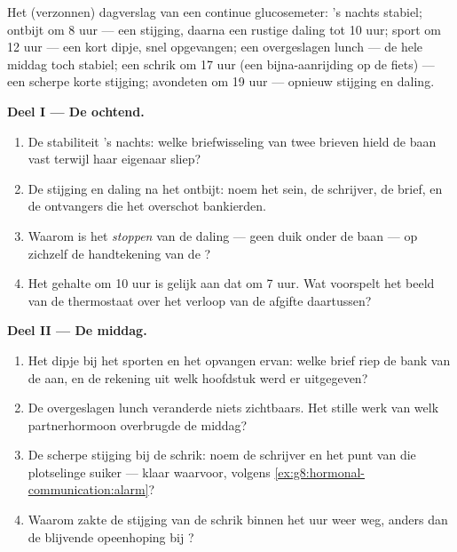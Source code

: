 \begin{problem}\label{pb:g8:hormonal-communication:1}
Het (verzonnen) dagverslag van een continue glucosemeter: 's nachts
stabiel; ontbijt om 8 uur --- een stijging, daarna een rustige daling tot
10 uur; sport om 12 uur --- een kort dipje, snel opgevangen; een
overgeslagen lunch --- de hele middag toch stabiel; een schrik om 17 uur
(een bijna-aanrijding op de fiets) --- een scherpe korte stijging; avondeten
om 19 uur --- opnieuw stijging en daling.

\medskip\noindent\textbf{Deel I --- De ochtend.}
\begin{enumerate}
  \item De stabiliteit 's nachts: welke briefwisseling van twee brieven
        hield de baan vast terwijl haar eigenaar sliep?
  \item De stijging en daling na het ontbijt: noem het sein, de schrijver,
        de brief, en de ontvangers die het overschot bankierden.
  \item Waarom is het \emph{stoppen} van de daling --- geen duik onder de
        baan --- op zichzelf de handtekening van de ?
  \item Het gehalte om 10 uur is gelijk aan dat om 7 uur. Wat voorspelt
        het beeld van de thermostaat over het verloop van de afgifte
        daartussen?
\end{enumerate}

\medskip\noindent\textbf{Deel II --- De middag.}
\begin{enumerate}[resume]
  \item Het dipje bij het sporten en het opvangen ervan: welke brief riep
        de bank van de  aan, en de rekening uit welk hoofdstuk werd
        er uitgegeven?
  \item De overgeslagen lunch veranderde niets zichtbaars. Het stille werk
        van welk partnerhormoon overbrugde de middag?
  \item De scherpe stijging bij de schrik: noem de schrijver en het punt
        van die plotselinge suiker --- klaar waarvoor, volgens
        \cref{ex:g8:hormonal-communication:alarm}?
  \item Waarom zakte de stijging van de schrik binnen het uur weer weg,
        anders dan de blijvende opeenhoping bij ?
\end{enumerate}


\end{problem}
